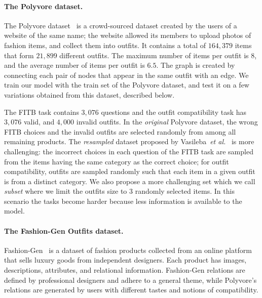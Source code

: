 \documentclass[10pt,twocolumn,letterpaper]{article}
\begin{document}
\paragraph{The Polyvore dataset.}
\label{sssec:poly}
The Polyvore dataset~\cite{han2017learning} is a crowd-sourced dataset created by the users of a website of the same name; the website allowed its members to upload photos of fashion items, and collect them into outfits. It contains a total of $164{,}379$ items that form $21{,}899$ different outfits. The maximum number of items per outfit is $8$, and the average number of items per outfit is $6.5$. The graph is created by connecting each pair of nodes that appear in the same outfit with an edge. We train our model with the train set of the Polyvore dataset, and test it on a few variations obtained from this dataset, described below. 









The FITB task contains $3{,}076$ questions and the outfit compatibility task has $3{,}076$ valid, and $4{,}000$ invalid outfits. In the \emph{original} Polyvore dataset, the wrong FITB choices and the invalid outfits are selected randomly from among all remaining products. 
The \emph{resampled} dataset proposed by Vasileba~\emph{et al.}~\cite{vasileva2018learning} is more challenging: the incorrect choices in each question of the FITB task are sampled from the items having the same category as the correct choice; for outfit compatibility, outfits are sampled randomly such that each item in a given outfit is from a distinct category. 
We also propose a more challenging set which we call \emph{subset} where we limit the outfits size to 3 randomly selected items. In this scenario the tasks become harder because less information is available to the model.







\paragraph{The Fashion-Gen Outfits dataset.}
\label{sssec:fgen}
Fashion-Gen~\cite{rostamzadeh2018fashion} is a dataset of fashion products collected from an online platform that sells luxury goods from independent designers. Each product has images, descriptions, attributes, and relational information. 
Fashion-Gen relations are defined by professional designers and adhere to a general theme, while Polyvore's relations are generated by users with different tastes and notions of compatibility.
\end{document}
